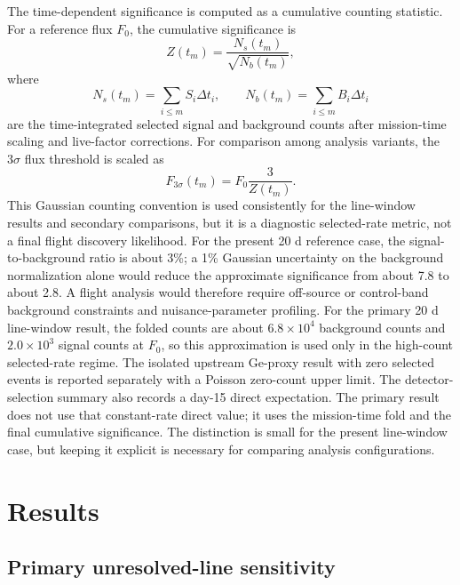 \documentclass[pdflatex,sn-mathphys-num]{sn-jnl}
\newcommand{\fzero}{F_{0}}
\newcommand{\fthree}{F_{3\sigma}}
\begin{document}
The time-dependent significance is computed as a cumulative counting statistic. For a reference flux $\fzero$, the cumulative significance is
\begin{equation}
  Z(t_m) = \frac{N_s(t_m)}{\sqrt{N_b(t_m)}},
\end{equation}
where
\begin{equation}
  N_s(t_m)=\sum_{i\leq m}S_i\Delta t_i,\qquad
  N_b(t_m)=\sum_{i\leq m}B_i\Delta t_i
\end{equation}
are the time-integrated selected signal and background counts after
mission-time scaling and live-factor corrections. For comparison among
analysis variants, the $3\sigma$ flux threshold is scaled as
\begin{equation}
  \fthree(t_m) = \fzero \frac{3}{Z(t_m)}.
\end{equation}
This Gaussian counting convention is used consistently for the line-window
results and secondary comparisons, but it is a diagnostic selected-rate metric,
not a final flight discovery likelihood. For the present 20 d reference case,
the signal-to-background ratio is about 3\%; a 1\% Gaussian uncertainty on the
background normalization alone would reduce the approximate significance from
about 7.8 to about 2.8. A flight analysis would therefore require off-source
or control-band background constraints and nuisance-parameter profiling.
For the primary 20 d line-window result, the folded counts are about
$6.8\times10^4$ background counts and $2.0\times10^3$ signal counts at
$\fzero$, so this approximation is used only in the high-count selected-rate
regime. The isolated upstream Ge-proxy result with zero selected events is
reported separately with a Poisson zero-count upper limit.
The detector-selection summary also records a day-15 direct expectation. The primary
result does not use that constant-rate direct value; it uses the
mission-time fold and the final cumulative significance. The distinction is
small for the present line-window case, but keeping it explicit is necessary
for comparing analysis configurations.

\section{Results}
\label{sec:results}

\subsection{Primary unresolved-line sensitivity}
\label{subsec:primary}
\end{document}

